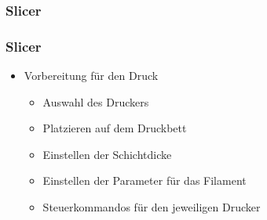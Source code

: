 {
\begin{frame}
  \frametitle{Slicer}
\end{frame}
}
{
\begin{frame}
  \frametitle{Slicer}
  \begin{itemize}
    \item Vorbereitung für den Druck \pause
    \begin{itemize}
      \item Auswahl des Druckers \pause
      \item Platzieren auf dem Druckbett \pause
      \item Einstellen der Schichtdicke \pause
      \item Einstellen der Parameter für das Filament \pause
      \item Steuerkommandos für den jeweiligen Drucker
    \end{itemize}
  \end{itemize}
\end{frame}
}
